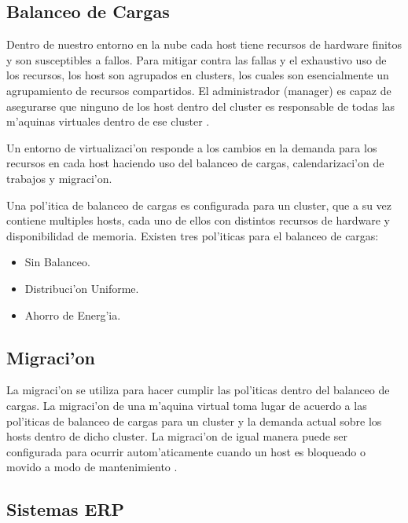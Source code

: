 \subsection*{Balanceo de Cargas}

Dentro de nuestro entorno en la nube cada host tiene recursos de hardware finitos y son susceptibles a fallos. Para mitigar contra las fallas y el exhaustivo uso de los recursos, los host son agrupados en clusters, los cuales son esencialmente un agrupamiento de recursos compartidos. El administrador (manager) es capaz de asegurarse que ninguno de los host dentro del cluster es responsable de todas las m'aquinas virtuales dentro de ese cluster \cite{redhat}.

Un entorno de virtualizaci'on responde a los cambios en la demanda para los recursos en cada host haciendo uso del balanceo de cargas, calendarizaci'on de trabajos y migraci'on.

Una pol'itica de balanceo de cargas es configurada para un cluster, que a su vez contiene multiples hosts, cada uno de ellos con distintos recursos de hardware y disponibilidad de memoria. \cite{redhat}
Existen tres pol'iticas para el balanceo de cargas:
\begin{itemize}
\item Sin Balanceo.
\item Distribuci'on Uniforme.
\item Ahorro de Energ'ia.
\end{itemize}

\subsection*{Migraci'on}

La migraci'on se utiliza para hacer cumplir las pol'iticas dentro del balanceo de cargas. La migraci'on de una m'aquina virtual toma lugar de acuerdo a las pol'iticas de balanceo de cargas para un cluster y la demanda actual sobre los hosts dentro de dicho cluster. La migraci'on de igual manera puede ser configurada para ocurrir autom'aticamente cuando un host es bloqueado o movido a modo de mantenimiento \cite{redhat}. 

\subsection*{Sistemas ERP}

